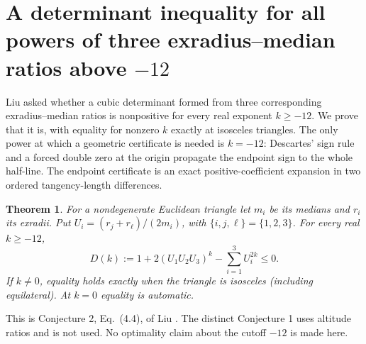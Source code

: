 \documentclass[11pt,a4paper]{article}
\numberwithin{equation}{section}
\newtheorem{theorem}{Theorem}[section]
\theoremstyle{definition}
\theoremstyle{remark}
\newenvironment{sectionabstract}{\par\smallskip\begingroup\small\noindent}{\par\endgroup\medskip}
\begin{document}
\par\endgroup

\begingroup

\section{\texorpdfstring{A determinant inequality for all powers of three exradius--median ratios above $-12$}{A determinant inequality for all powers of three exradius--median ratios above -12}}\label{section:r39meiji}
\par\medskip


\begin{sectionabstract}
Liu asked whether a cubic determinant formed from three corresponding exradius--median ratios is nonpositive for every real exponent $k\ge-12$. We prove that it is, with equality for nonzero $k$ exactly at isosceles triangles. The only power at which a geometric certificate is needed is $k=-12$: Descartes' sign rule and a forced double zero at the origin propagate the endpoint sign to the whole half-line. The endpoint certificate is an exact positive-coefficient expansion in two ordered tangency-length differences.
\end{sectionabstract}

\begin{theorem}
For a nondegenerate Euclidean triangle let $m_i$ be its medians and $r_i$ its exradii. Put $U_i=(r_j+r_\ell)/(2m_i)$, with $\{i,j,\ell\}=\{1,2,3\}$. For every real $k\ge-12$,
\[
 D(k):=1+2(U_1U_2U_3)^k-\sum_{i=1}^3U_i^{2k}\le0 .
 \tag{1}
\]
If $k\ne0$, equality holds exactly when the triangle is isosceles (including equilateral). At $k=0$ equality is automatic.
\end{theorem}
This is Conjecture 2, Eq.~(4.4), of Liu \cite[p.~73]{r39meiji:liu}. The distinct Conjecture 1 uses altitude ratios and is not used. No optimality claim about the cutoff $-12$ is made here.
\end{document}

